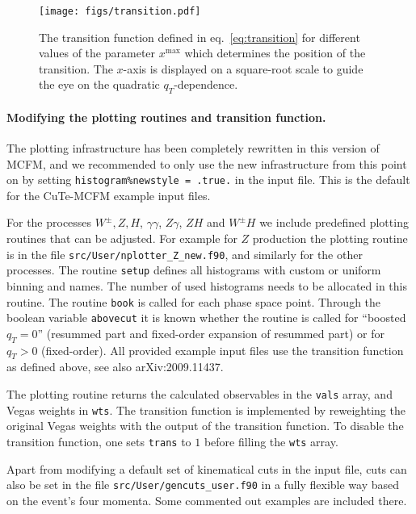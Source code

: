 \documentclass[
  11pt]{scrartcl}
\begin{document}
\begin{figure}[t!]
	\centering
	\texttt{[image: figs/transition.pdf]}
    \caption{The transition function defined in eq.~\eqref{eq:transition} for different values of the parameter $x^\text{max}$ which determines the position of the 
	transition. The $x$-axis is displayed on a square-root scale 
		to guide the eye on 
		the quadratic $q_T$-dependence.}
	\label{fig:transition}
\end{figure}

\paragraph{Modifying the plotting routines and transition function.}
The plotting infrastructure has been completely rewritten in this
version of MCFM, and we recommended to only use the new infrastructure
from this point on by setting \texttt{histogram\%newstyle = .true.} in
the input file. This is the default for the CuTe-MCFM example input files.

For the processes \(W^\pm,Z,H\), \(\gamma\gamma\), \(Z\gamma\), \(ZH\)
and \(W^\pm H\) we include predefined plotting routines that can be
adjusted. For example for \(Z\) production the plotting routine is in the file
\texttt{src/User/nplotter\_Z\_new.f90}, and similarly for the other processes.
The routine \texttt{setup} defines all histograms with custom or uniform
binning and names. The
number of used histograms needs to be allocated in this routine. The
routine \texttt{book} is called for each phase space point. Through the
boolean variable \texttt{abovecut} it is known whether the routine is
called for ``boosted \(q_T=0\)'' (resummed part and fixed-order expansion of
resummed part) or for \(q_T>0\) (fixed-order). All provided example input files
use the transition function as defined above, see also arXiv:2009.11437.

The plotting routine returns the calculated observables in the
\texttt{vals} array, and Vegas weights in \texttt{wts}. The transition
function is implemented by reweighting the original Vegas weights with
the output of the transition function. To disable the transition
function, one sets \texttt{trans} to \(1\) before filling the \texttt{wts}
array.

Apart from modifying a default set of kinematical cuts in the input
file, cuts can also be set in the file
\texttt{src/User/gencuts\_user.f90} in a fully flexible way based on the
event's four momenta. Some commented out examples are included there.
\end{document}
